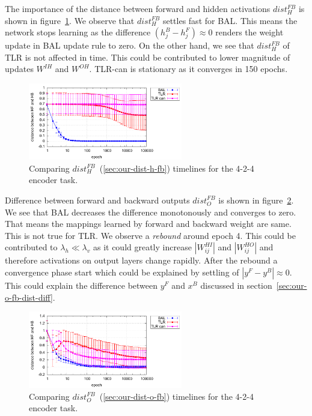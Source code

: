 The importance of the distance between forward and hidden activations $dist_{H}^{FB}$ is shown in figure~\ref{fig:results-candidates-h-fb-d}. We observe that $dist_{H}^{FB}$ settles fast for BAL. This means the network stops learning as the difference $(h^B_j - h^F_j) \approx 0$ renders the weight update in BAL update rule to zero. On the other hand, we see that $dist_{H}^{FB}$ of TLR is not affected in time. This could be contributed to lower magnitude of updates $W^{IH}$ and $W^{OH}$. TLR-can is stationary as it converges in 150 epochs. 

\begin{figure}[H]
  \centering
  \includegraphics[width=0.6\textwidth]{img/feature-cmp-h-fb-d.pdf}  
   \caption{Comparing $dist_{H}^{FB}$~(\ref{sec:our-dist-h-fb}) timelines for the {4-2-4 encoder} task.}
  \label{fig:results-candidates-h-fb-d}
\end{figure}

Difference between forward and backward outputs $dist_{O}^{FB}$ is shown in figure~\ref{fig:results-candidates-o-fb-d}. We see that BAL decreases the difference monotonously and converges to zero. That means the mappings learned by forward and backward weight are same. This is not true for TLR. We observe a \emph{rebound} around epoch 4. This could be contributed to $\lambda_h \ll \lambda_v$ as it could greatly increase $|W^{HI}_{ij}|$ and $|W^{HO}_{ij}|$ and therefore activations on output layers change rapidly. After the rebound a convergence phase start which could be explained by settling of $|y^{F} - y^{B}| \approx 0$. This could explain the difference between $y^{F}$ and $x^B$ discussed in section~\ref{sec:our-o-fb-dist-diff}. 

\begin{figure}[H]
  \centering
  \includegraphics[width=0.6\textwidth]{img/feature-cmp-o-fb-d.pdf}  
   \caption{Comparing $dist_{O}^{FB}$~(\ref{sec:our-dist-o-fb}) timelines for the {4-2-4 encoder} task.}
  \label{fig:results-candidates-o-fb-d}
\end{figure}


